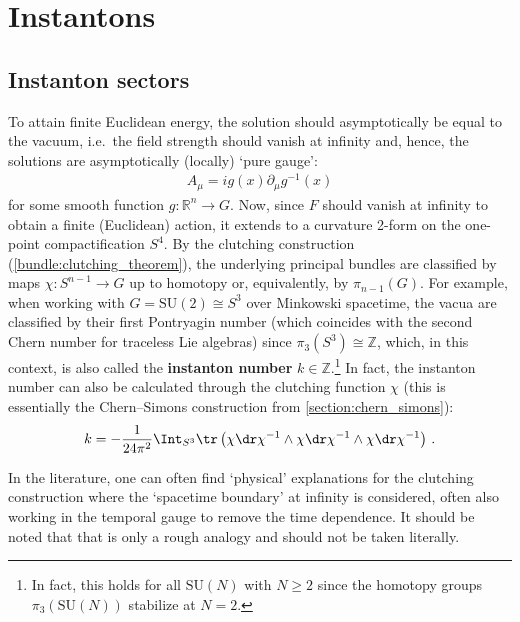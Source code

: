 \section{Instantons}\label{gauge:instantons}
\subsection{Instanton sectors}


    To attain finite Euclidean energy, the solution should asymptotically be equal to the vacuum, i.e.~the field strength should vanish at infinity and, hence, the solutions are asymptotically (locally) `pure gauge':
    \begin{gather}
        A_\mu = ig(x)\partial_\mu g^{-1}(x)
    \end{gather}
    for some smooth function $g:\mathbb{R}^n\rightarrow G$. Now, since $F$ should vanish at infinity to obtain a finite (Euclidean) action, it extends to a curvature 2-form on the one-point compactification $S^4$. By the clutching construction (\cref{bundle:clutching_theorem}), the underlying principal bundles are classified by maps $\chi:S^{n-1}\rightarrow G$ up to homotopy or, equivalently, by $\pi_{n-1}(G)$. For example, when working with $G=\mathrm{SU}(2)\cong S^3$ over Minkowski spacetime, the vacua are classified by their first Pontryagin number (which coincides with the second Chern number for traceless Lie algebras) since $\pi_3(S^3)\cong\mathbb{Z}$, which, in this context, is also called the \textbf{instanton number} $k\in\mathbb{Z}$.\footnote{In fact, this holds for all $\mathrm{SU}(N)$ with $N\geq2$ since the homotopy groups $\pi_3(\mathrm{SU}(N))$ stabilize at $N=2$.} In fact, the instanton number can also be calculated through the clutching function $\chi$ (this is essentially the Chern--Simons construction from \cref{section:chern_simons}):
    \begin{gather}
        \label{gauge:winding_number}
        k = -\frac{1}{24\pi^2}\Int_{S^3}\tr\left(\chi\dr\chi^{-1}\wedge\chi\dr\chi^{-1}\wedge\chi\dr\chi^{-1}\right)\,.
    \end{gather}

    \begin{remark}[Literature]
        In the literature, one can often find `physical' explanations for the clutching construction where the `spacetime boundary' at infinity is considered, often also working in the temporal gauge to remove the time dependence. It should be noted that that is only a rough analogy and should not be taken literally. 
    \end{remark}

